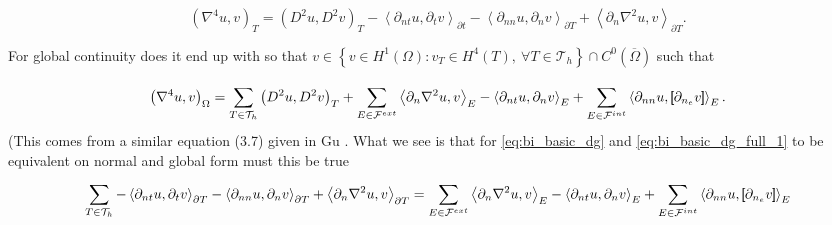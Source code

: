 \begin{equation}
\label{eq:bi_basic_dg}
\left( \nabla ^{4} u,v \right) _{T} = \left( D^2u,D^2v \right) _{T } - \left<\partial _{nt} u, \partial _{t}v
\right>_{\partial t} - \left<\partial _{nn} u, \partial _{n}v \right>_{\partial T} + \left<\partial _{n} \nabla ^2 u,v
\right>_{\partial T}
.\end{equation}

For global continuity does it end up with  so that $v \in \left\{ v \in H^{1}\left( \Omega  \right): v_{T} \in  H^{4}\left( T \right), \ \forall T \in
\mathcal{T}_{h}    \right\}   \cap C^{0} (
\overline{\Omega }  ) $ such that

\begin{equation}
\label{eq:bi_basic_dg_full_1}
\left( \nabla ^{4} u, v \right) _{\Omega }
= \sum_{T \in  \mathcal{T} _{h}}^{} \left( D^2u, D^2v \right)_{T}  + \sum_{E \in
\mathcal{F} ^{ext}_{}}^{} \left<\partial _{n} \nabla  ^2 u, v  \right> _{E}
- \left<\partial _{nt} u, \partial _{n} v \right> _{E}
+ \sum_{E \in \mathcal{F}  ^{int}}^{} \left<\partial _{nn} u , \left[\!\!\left[  \partial _{n_{e}} v  \right]\!\!\right]
\right>_{E}
.\end{equation}
(This comes from a similar equation (3.7) given in Gu \cite{gu2012c0}.
What we see is that for \eqref{eq:bi_basic_dg} and \eqref{eq:bi_basic_dg_full_1} to be equivalent on normal and global form must this be true
\[
 \sum_{T \in  \mathcal{T}_{h} }^{}  - \left<\partial _{nt} u, \partial _{t}v
\right>_{\partial T} - \left<\partial _{nn} u, \partial _{n}v \right>_{\partial T} + \left<\partial _{n} \nabla ^2 u,v
\right>_{\partial T}
=  \sum_{E \in
\mathcal{F}^{ext}  }^{} \left<\partial _{n} \nabla  ^2 u, v  \right> _{E}
- \left<\partial _{nt} u, \partial _{n} v \right> _{E}
+ \sum_{E \in \mathcal{F}^{int} }^{} \left<\partial _{nn} u , \left[\!\!\left[  \partial _{n_{e}} v  \right]\!\!\right]
\right>_{E}
\]




